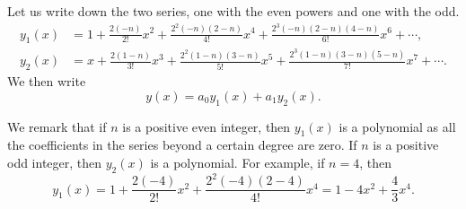 \documentclass{ximera}
\begin{document}
\begin{exampleSol}
Let us write down the two series, one with the even powers and one with the odd.
\begin{align*}
    y_1(x) & =  1+\frac{2(-n)}{2!} x^2 + \frac{2^2(-n)(2-n)}{4!} x^4 +  \frac{2^3(-n)(2-n)(4-n)}{6!} x^6 + \cdots , \\
    y_2(x) & =  x+\frac{2(1-n)}{3!} x^3 + \frac{2^2(1-n)(3-n)}{5!} x^5 +  \frac{2^3(1-n)(3-n)(5-n)}{7!} x^7 + \cdots .
\end{align*}
We then write
\begin{equation*}
    y(x) = a_0 y_1(x) + a_1 y_2(x) .
\end{equation*}

We remark that if $n$ is a positive even integer, then $y_1(x)$ is a polynomial as all the coefficients in the series beyond a certain degree are zero.  If $n$ is a positive odd integer, then $y_2(x)$ is a polynomial.  For example, if $n=4$, then
\begin{equation*}
    y_1(x) = 1 + \frac{2(-4)}{2!} x^2 + \frac{2^2(-4)(2-4)}{4!} x^4 = 1 - 4x^2 + \frac{4}{3} x^4 .
\end{equation*}
\end{exampleSol}
\end{document}
